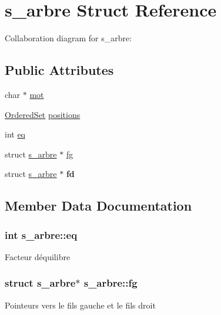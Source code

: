 \hypertarget{structs__arbre}{}\section{s\+\_\+arbre Struct Reference}
\label{structs__arbre}


Collaboration diagram for s\+\_\+arbre\+:
\subsection*{Public Attributes}
{\bf }\par
\begin{DoxyCompactItemize}
\item 
char $\ast$ \hyperlink{structs__arbre_a7853fb86d241c6569f3449e6589f3c8a}{mot}
\item 
\hyperlink{ensemble_8h_aaaccd0a5a3eec060c270e18a1f546fcb}{Ordered\+Set} \hyperlink{structs__arbre_af3754e685aace8398941e5a09190201c}{positions}
\item 
int \hyperlink{structs__arbre_a812df31061e80748e138fb2248556540}{eq}
\item 
struct \hyperlink{structs__arbre}{s\+\_\+arbre} $\ast$ \hyperlink{structs__arbre_ac3fec87fd94a912facfdf4c0ffef5ea3}{fg}
\item 
struct \hyperlink{structs__arbre}{s\+\_\+arbre} $\ast$ {\bfseries fd}\hypertarget{structs__arbre_a365d9e017f8667aa29a0b86f5b668350}{}\label{structs__arbre_a365d9e017f8667aa29a0b86f5b668350}

\end{DoxyCompactItemize}



\subsection{Member Data Documentation}
\subsubsection[{\texorpdfstring{eq}{eq}}]{\setlength{\rightskip}{0pt plus 5cm}int s\+\_\+arbre\+::eq}\hypertarget{structs__arbre_a812df31061e80748e138fb2248556540}{}\label{structs__arbre_a812df31061e80748e138fb2248556540}
Facteur d\textquotesingle{}équilibre 
\subsubsection[{\texorpdfstring{fg}{fg}}]{\setlength{\rightskip}{0pt plus 5cm}struct {\bf s\+\_\+arbre}$\ast$ s\+\_\+arbre\+::fg}\hypertarget{structs__arbre_ac3fec87fd94a912facfdf4c0ffef5ea3}{}\label{structs__arbre_ac3fec87fd94a912facfdf4c0ffef5ea3}
Pointeurs vers le fils gauche et le fils droit 
